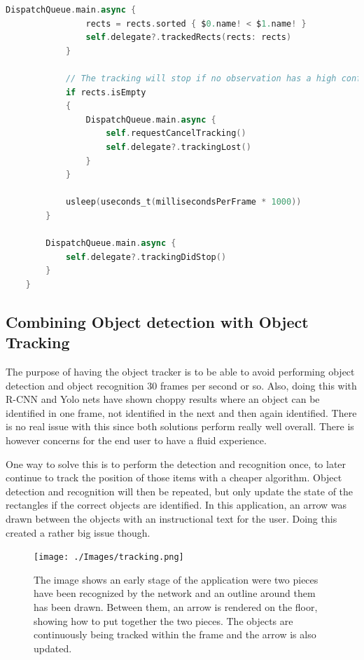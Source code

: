 \begin{lstlisting}[language=swift]
            DispatchQueue.main.async {
                rects = rects.sorted { $0.name! < $1.name! }
                self.delegate?.trackedRects(rects: rects)
            }
            
            // The tracking will stop if no observation has a high confidence value
            if rects.isEmpty
            {
                DispatchQueue.main.async {
                    self.requestCancelTracking()
                    self.delegate?.trackingLost()
                }
            }

            usleep(useconds_t(millisecondsPerFrame * 1000))
        }
        
        DispatchQueue.main.async {
            self.delegate?.trackingDidStop()
        }
    }
\end{lstlisting}


\subsection{Combining Object detection with Object Tracking}
The purpose of having the object tracker is to be able to avoid performing object detection and object recognition 30 frames per second or so. Also, doing this with R-CNN and Yolo nets have shown choppy results where an object can be identified in one frame, not identified in the next and then again identified.
There is no real issue with this since both solutions perform really well overall. There is however concerns for the end user to have a fluid experience.

One way to solve this is to perform the detection and recognition once, to later continue to track the position of those items with a cheaper algorithm.
Object detection and recognition will then be repeated, but only update the state of the rectangles if the correct objects are identified.
In this application, an arrow was drawn between the objects with an instructional text for the user. Doing this created a rather big issue though.

\begin{figure}[!hbtp]
\begin{center}
\texttt{[image: ./Images/tracking.png]}
\caption{The image shows an early stage of the application were two pieces have been recognized by the network and an outline around them has been drawn. Between them, an arrow is rendered on the floor, showing how to put together the two pieces. The objects are continuously being tracked within the frame and the arrow is also updated.}
\label{fig:tracking}
\end{center}
\end{figure}

